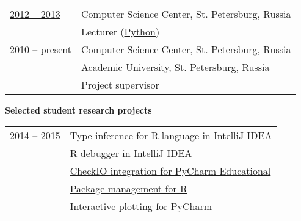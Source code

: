 \documentclass[letterpaper,11pt,oneside]{article}
\begin{document}
\begin{tabular}{@{} l l}
\underline{2012 -- 2013}          & Computer Science Center, St. Petersburg, Russia  \\
                        	 		     & Lecturer (\href{https://compscicenter.ru/courses/python/2012-autumn/classes/}{Python})  \vspace{1em} \\
                        	 		     
\underline{2010 -- present}       & Computer Science Center, St. Petersburg, Russia  \\
                          		  	   & Academic University, St. Petersburg, Russia  \\
                    		           & Project supervisor  \vspace{1em} \\

\end{tabular}

\noindent \textbf{Selected student research projects} \vspace{1em} 

\noindent \begin{tabular}{@{} l l}


\underline{2014 -- 2015} &  \hspace{10mm}\href{https://github.com/medvector/TheRPlugin}{Type inference for R language in IntelliJ IDEA}   \\
                         &  \hspace{10mm}\href{https://github.com/holgerbrandl/r4intellij}{R debugger in IntelliJ IDEA} \\
                         &  \hspace{10mm}\href{https://github.com/evgraph/CheckIOPyCharmPlugin}{CheckIO integration for PyCharm Educational} \\
                         &  \hspace{10mm}\href{https://github.com/avesloguzova/TheRPlugin}{Package management for R} \\                                                          
                         &  \hspace{10mm}\href{https://github.com/cexcell/pycharm_interactive_charts}{Interactive plotting for PyCharm} \vspace{1em} \\

\end{tabular}
\end{document}

